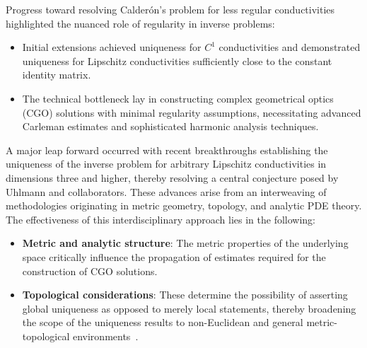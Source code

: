 \documentclass[sigconf]{acmart}
\begin{document}
Progress toward resolving Calderón's problem for less regular conductivities highlighted the nuanced role of regularity in inverse problems:

\begin{itemize}
    \item Initial extensions achieved uniqueness for $C^1$ conductivities and demonstrated uniqueness for Lipschitz conductivities sufficiently close to the constant identity matrix.
    \item The technical bottleneck lay in constructing complex geometrical optics (CGO) solutions with minimal regularity assumptions, necessitating advanced Carleman estimates and sophisticated harmonic analysis techniques.
\end{itemize}

A major leap forward occurred with recent breakthroughs establishing the uniqueness of the inverse problem for arbitrary Lipschitz conductivities in dimensions three and higher, thereby resolving a central conjecture posed by Uhlmann and collaborators. These advances arise from an interweaving of methodologies originating in metric geometry, topology, and analytic PDE theory. The effectiveness of this interdisciplinary approach lies in the following:

\begin{itemize}
    \item \textbf{Metric and analytic structure}: The metric properties of the underlying space critically influence the propagation of estimates required for the construction of CGO solutions.
    \item \textbf{Topological considerations}: These determine the possibility of asserting global uniqueness as opposed to merely local statements, thereby broadening the scope of the uniqueness results to non-Euclidean and general metric-topological environments~\cite{ref102}.
\end{itemize}
\end{document}
